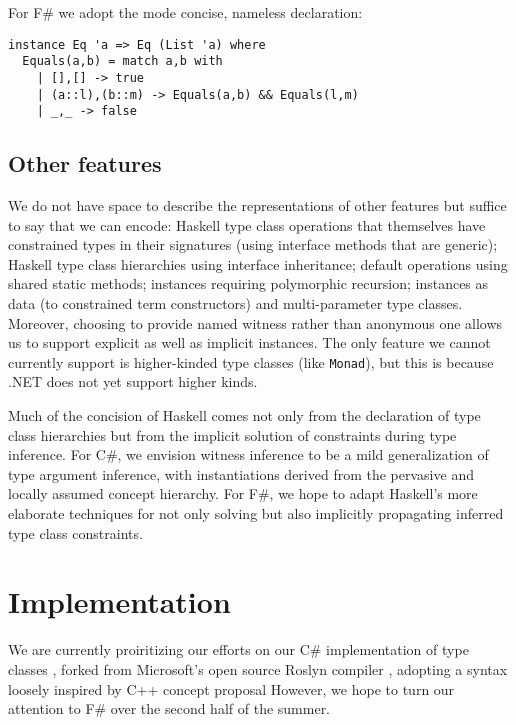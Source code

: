 \documentclass[preprint]{sig-alternate-05-2015}
\begin{document}
For F\# we adopt the mode concise, nameless declaration:

\begin{lstlisting}
instance Eq 'a => Eq (List 'a) where 
  Equals(a,b) = match a,b with
    | [],[] -> true
    | (a::l),(b::m) -> Equals(a,b) && Equals(l,m)
    | _,_ -> false
\end{lstlisting}

\subsection{Other features}

We do not have space to describe the representations of other features but suffice to say that we can encode:
Haskell type class operations that themselves have constrained types in their signatures (using interface methods that are generic);
Haskell type class hierarchies  using interface inheritance; default operations using shared static methods; instances requiring 
polymorphic recursion; instances as data (to constrained term constructors) and multi-parameter type classes. Moreover, choosing to provide named witness rather than anonymous one allows us to support
explicit as well as implicit instances.
The only feature we cannot currently support is higher-kinded type classes (like \lstinline{Monad}), but this is because .NET does not yet support higher kinds.

Much of the concision of Haskell comes not only from the declaration of type class hierarchies but from the implicit solution of constraints during type inference.
For C\#, we envision witness inference to be a mild generalization of type argument inference, with instantiations derived from the pervasive and locally assumed concept hierarchy.
For F\#, we hope to adapt Haskell's more elaborate techniques for not only solving but also implicitly propagating inferred type class constraints.
\section{Implementation}

We are currently proiritizing our efforts on our C\# implementation of type classes \cite{Roslynfork}, forked from Microsoft's open source Roslyn compiler \cite{Roslyn}, adopting a syntax loosely inspired by C++ concept proposal 
However, we hope to turn our attention to F\# over the second half of the summer.


 
\end{document}
